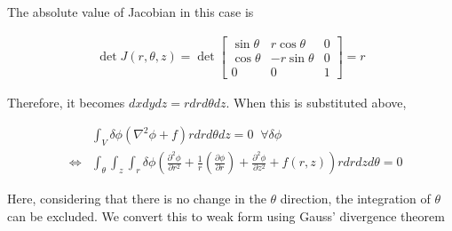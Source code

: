 The absolute value of Jacobian in this case is

\begin{eqnarray}
\det J(r,\theta,z)
=
\det \left[\begin{array} {lll}
\sin\theta & r \cos\theta & 0 \\
\cos\theta & -r\sin\theta & 0 \\
0 & 0 &  1
\end{array}\right] = r
\end{eqnarray}

Therefore, it becomes $dxdydz = r drd\theta dz$. When this is substituted above,

\begin{eqnarray}
&& \int_V\delta\phi (\nabla^2\phi+f) r drd\theta dz = 0\;\; \forall \delta\phi\\
&\Leftrightarrow& \int_\theta\int_z\int_r \delta\phi\left(\frac{\partial^2\phi}{\partial r^2} + \frac{1}{r}\left(\frac{\partial\phi}{\partial r}\right) + \frac{\partial^2 \phi}{\partial z^2} + f(r,z)\right) r drdzd\theta = 0
\end{eqnarray}

Here, considering that there is no change in the $\theta$ direction, the integration of $\theta$ can be excluded. We convert this to weak form using Gauss' divergence theorem

